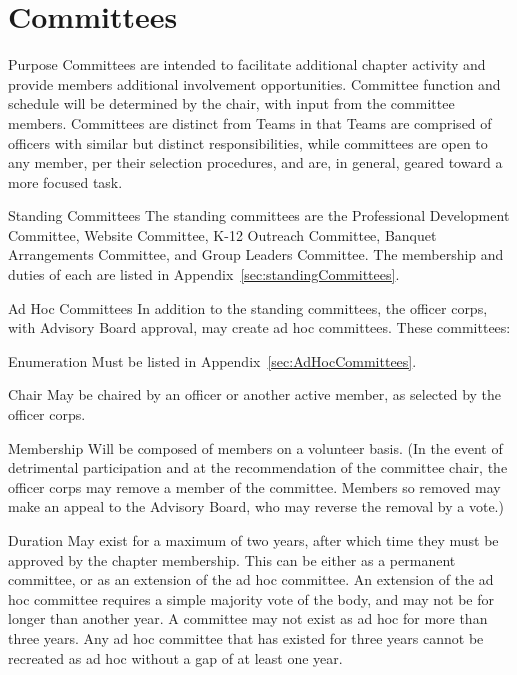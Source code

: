 \section{Committees}
\begin{enumsubsection}
\item{Purpose}
Committees are intended to facilitate additional chapter activity and provide members additional involvement opportunities.
Committee function and schedule will be determined by the chair, with input from the committee members.
Committees are distinct from Teams in that Teams are comprised of officers with similar but distinct responsibilities, while committees are open to any member, per their selection procedures, and are, in general, geared toward a more focused task.
\item{Standing Committees}
The standing committees are the Professional Development Committee, Website Committee, K-12 Outreach Committee, Banquet Arrangements Committee, and Group Leaders Committee.
The membership and duties of each are listed in Appendix~\ref{sec:standingCommittees}.
\item{Ad Hoc Committees}\label{sec:AdHocCommitteeCreation}
In addition to the standing committees, the officer corps, with Advisory Board approval, may create ad hoc committees.
These committees:
\begin{enumsubsubsection}
\item*{Enumeration}
Must be listed in Appendix~\ref{sec:AdHocCommittees}.
\item*{Chair}
May be chaired by an officer or another active member, as selected by the officer corps.
\item*{Membership}
Will be composed of members on a volunteer basis.
(In the event of detrimental participation and at the recommendation of the committee chair, the officer corps may remove a member of the committee.
Members so removed may make an appeal to the Advisory Board, who may reverse the removal by a  vote.)
\item*{Duration}
May exist for a maximum of two years, after which time they must be approved by the chapter membership.
This can be either as a permanent committee, or as an extension of the ad hoc committee.
An extension of the ad hoc committee requires a simple majority vote of the body, and may not be for longer than another year.
A committee may not exist as ad hoc for more than three years.
Any ad hoc committee that has existed for three years cannot be recreated as ad hoc without a gap of at least one year.
\end{enumsubsubsection}
\end{enumsubsection}

